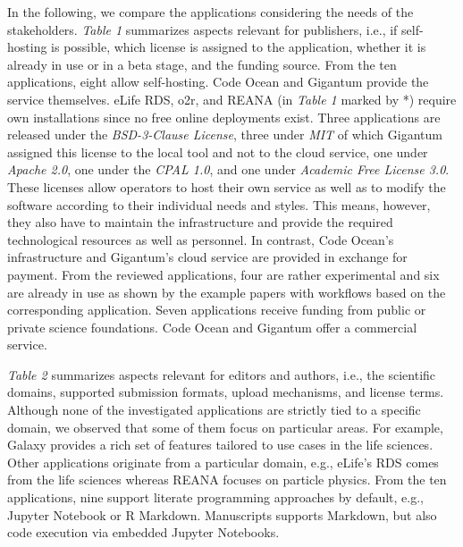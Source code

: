 \documentclass[onecolumn]{article}
\begin{document}
In the following, we compare the applications considering the needs of
the stakeholders. \emph{Table 1} summarizes aspects relevant for
publishers, i.e., if self-hosting is possible, which license is assigned
to the application, whether it is already in use or in a beta stage, and
the funding source. From the ten applications, eight allow self-hosting.
Code Ocean and Gigantum provide the service themselves. eLife RDS, o2r,
and REANA (in \emph{Table 1} marked by *) require own installations
since no free online deployments exist. Three applications are released
under the \emph{BSD-3-Clause License}, three under \emph{MIT} of which
Gigantum assigned this license to the local tool and not to the cloud
service, one under \emph{Apache 2.0}, one under the \emph{CPAL 1.0}, and
one under \emph{Academic Free License 3.0}. These licenses allow
operators to host their own service as well as to modify the software
according to their individual needs and styles. This means, however,
they also have to maintain the infrastructure and provide the required
technological resources as well as personnel. In contrast, Code Ocean's
infrastructure and Gigantum's cloud service are provided in exchange for
payment. From the reviewed applications, four are rather experimental
and six are already in use as shown by the example papers with workflows
based on the corresponding application. Seven applications receive
funding from public or private science foundations. Code Ocean and
Gigantum offer a commercial service.

\emph{Table 2} summarizes aspects relevant for editors and authors,
i.e., the scientific domains, supported submission formats, upload
mechanisms, and license terms. Although none of the investigated
applications are strictly tied to a specific domain, we observed that
some of them focus on particular areas. For example, Galaxy provides a
rich set of features tailored to use cases in the life sciences. Other
applications originate from a particular domain, e.g., eLife's RDS comes
from the life sciences whereas REANA focuses on particle physics. From
the ten applications, nine support literate programming approaches by
default, e.g., Jupyter Notebook or R Markdown. Manuscripts supports
Markdown, but also code execution via embedded Jupyter Notebooks.
\end{document}
